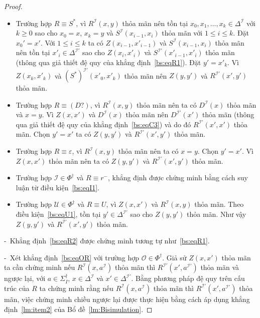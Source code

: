 \documentclass[12pt,a4paper,twoside]{report}
\newcommand{\mI}		{\mathcal{I}}
\newcommand{\mO}		{\mathcal{O}}
\newcommand{\mU}		{\mathcal{U}}
\newcommand{\SigmaDagI}	{\Sigma^\dag_I}
\newcommand{\PhiDag}	{\Phi^\dag}
\newcommand{\semiItem}	{\mbox{- }}
\theoremstyle{definition}
\begin{document}
\begin{proof}
\begin{itemize}
  \item Trường hợp $R \equiv S^*$, vì $R^\mI(x,y)$ thỏa mãn nên tồn tại $x_0, x_1, \ldots, x_k \in \Delta^\mI$ với $k \geq 0$ sao cho $x_0 = x$, $x_k = y$ và $S^\mI(x_{i-1}, x_i)$ thỏa mãn với $1 \leq i \leq k$. Đặt $x_0' = x'$. Với $1 \leq i \leq k$ ta có $Z(x_{i-1}, x'_{i-1})$ và $S^\mI(x_{i-1}, x_i)$ thỏa mãn nên tồn tại $x'_i \in \Delta^{\mI'}$ sao cho $Z(x_i, x'_i)$ và $S^{\mI'}(x'_{i-1}, x'_i)$ thỏa mãn (thông qua giả thiết đệ quy của khẳng định~\eqref{bs:eqR1}). Đặt $y'=x'_k$. Vì $Z(x_k,x'_k)$ và $(S^*)^{\mI'}(x'_0, x'_k)$ thỏa mãn nên $Z(y,y')$ và $R^{\mI'}(x',y')$ thỏa mãn.

  \item Trường hợp $R \equiv (D?)$, vì $R^\mI(x,y)$ thỏa mãn nên ta có $D^\mI(x)$ thỏa mãn và $x=y$. Vì $Z(x,x')$ và $D^\mI(x)$ thỏa mãn nên $D^{\mI'}(x')$ thỏa mãn (thông qua giả thiết đệ quy của khẳng định~\eqref{bs:eqC3}) và do đó $R^{\mI'}(x',x')$ thỏa mãn. Chọn $y' = x'$ ta có $Z(y,y')$ và $R^{\mI'}(x',y')$ thỏa mãn.
  
  \item Trường hợp $R \equiv \varepsilon$, vì $R^\mI(x,y)$ thỏa mãn nên ta có $x=y$. Chọn $y' = x'$. Vì $Z(x,x')$ thỏa mãn nên ta có $Z(y,y')$ và $R^{\mI'}(x',y')$ thỏa mãn.
  
  \item Trường hợp $\mI \in \PhiDag$ và $R \equiv r^-$, khẳng định được chứng minh bằng cách suy luận từ điều kiện~\eqref{bs:eqI1}.
  
  \item Trường hợp $\mU \in \PhiDag$ và $R \equiv U$, vì $Z(x, x')$ và $R^{\mI}(x,y)$ thỏa mãn. Theo điều kiện~\eqref{bs:eqU1}, tồn tại $y' \in \Delta^{\mI'}$ sao cho $Z(y,y')$ thỏa mãn. Như vậy $Z(y,y')$ và $R^{\mI'}(x',y')$ thỏa mãn.
\end{itemize}

\semiItem Khẳng định~\eqref{bs:eqR2} được chứng minh tương tự như~\eqref{bs:eqR1}.

\semiItem Xét khẳng định~\eqref{bs:eqOR} với trường hợp $\mO \in \PhiDag$. Giả sử $Z(x,x')$ thỏa mãn ta cần chứng minh nếu $R^\mI(x,a^\mI)$ thỏa mãn thì $R^{\mI'}(x',a^{\mI'})$ thỏa mãn và ngược lại, với $a \in \SigmaDagI$, $x \in \Delta^\mI$ và $x' \in \Delta^{\mI'}$. 
%
Bằng phương pháp đệ quy trên cấu trúc của $R$ ta chứng minh rằng nếu $R^\mI(x,a^\mI)$ thỏa mãn thì $R^{\mI'}(x',a^{\mI'})$ thỏa mãn, việc chứng minh chiều ngược lại được thực hiện bằng cách áp dụng khẳng định~\ref{lm:item2} của Bổ đề~\ref{lm:Bisimulation}.


\end{proof}
\end{document}
